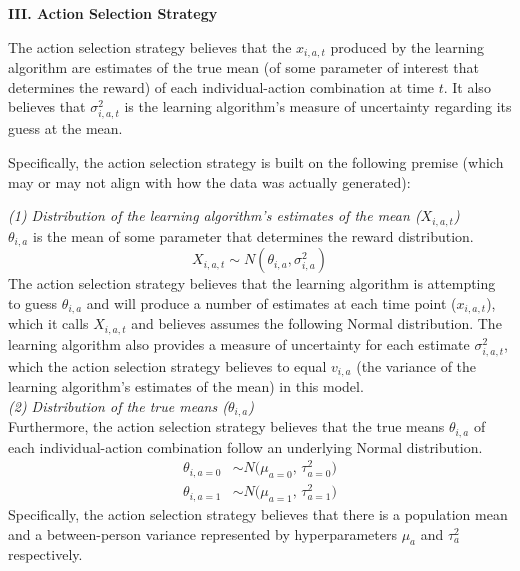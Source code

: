 \documentclass[letterpaper, 11pt]{extarticle}
\begin{document}
\textsf{\textbf {III. Action Selection Strategy}}

The action selection strategy believes that the $x_{i,a,t}$ produced by the learning algorithm are estimates of the true mean (of some parameter of interest that determines the reward) of each individual-action combination at time $t$. It also believes that $\sigma^2_{i,a,t}$ is the learning algorithm's measure of uncertainty regarding its guess at the mean. 

Specifically, the action selection strategy is built on the following premise (which may or may not align with how the data was actually generated):

\begin{problem}

\textit{(1) Distribution of the learning algorithm's estimates of the mean ($X_{i,a,t}$)}\\

$\theta_{i,a}$ is the mean of some parameter that determines the reward distribution. 
$$X_{i,a,t} \sim N(\theta_{i,a}, \sigma^2_{i,a})$$
The action selection strategy believes that the learning algorithm is attempting to guess $\theta_{i,a}$ and will produce a number of estimates at each time point ($x_{i,a,t}$), which it calls $X_{i,a,t}$ and believes assumes the following Normal distribution. The learning algorithm also provides a measure of uncertainty for each estimate $\sigma^2_{i,a,t}$, which the action selection strategy believes to equal $v_{i,a}$ (the variance of the learning algorithm's estimates of the mean) in this model.\\

\textit{(2) Distribution of the true means ($\theta_{i,a}$)}\\

Furthermore, the action selection strategy believes that the true means $\theta_{i,a}$ of each individual-action combination follow an underlying Normal distribution.
\begin{align*}
    \theta_{i,{a=0}} &\sim N\!\big(\mu_{a=0}, \, \tau_{a=0}^{2}\big)\\
    \theta_{i,{a=1}} &\sim N\!\big(\mu_{a=1}, \, \tau_{a=1}^{2}\big)
\end{align*}
Specifically, the action selection strategy believes that there is a population mean and a between-person variance represented by hyperparameters $\mu_{a}$ and $\tau_{a}^{2}$ respectively. 

\end{problem}
\end{document}
